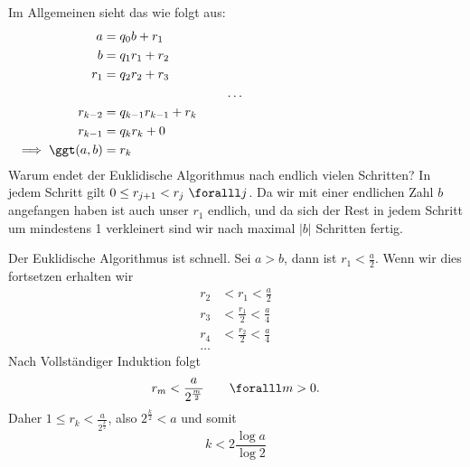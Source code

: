 Im Allgemeinen sieht das wie folgt aus:
\begin{align*}
	a &= q_0 b + r_1\\
	b &= q_1 r_1 + r_2\\
	r_1 &= q_2 r_2 + r_3\\
	\noalign{\centering \dots}
	r_{k-2} &= q_{k-1} r_{k-1} + r_k\\
	r_{k-1} &= q_k r_k + 0\\
	\implies \ggt(a,b) &= r_k
\end{align*}
Warum endet der Euklidische Algorithmus nach endlich vielen Schritten? In jedem Schritt gilt $0 \leq r_{j+1} < r_j \ \foralll j$. Da wir mit einer endlichen Zahl $b$ angefangen haben ist auch unser $r_1$ endlich, und da sich der Rest in jedem Schritt um mindestens 1 verkleinert sind wir nach maximal $|b|$ Schritten fertig.

Der Euklidische Algorithmus ist schnell. Sei $a > b$, dann ist $r_1 < \frac{a}{2}$. Wenn wir dies fortsetzen erhalten wir 
\begin{align*}
	r_2 &< r_1 < \frac{a}{2}\\
	r_3 &< \frac{r_1}{2} < \frac{a}{4}\\
	r_4 &< \frac{r_2}{2} < \frac{a}{4}\\
	\dots
\end{align*}
Nach Vollständiger Induktion folgt 
\[ r_m < \frac{a}{2^{\frac{m}{2}}}\qquad \foralll m>0. \]
Daher \( 1 \leq r_k < \frac{a}{2^{\frac{k}{2}}} \), also \( 2^\frac{k}{2} < a \) und somit
\[ k < 2\frac{\log a}{\log 2} \]